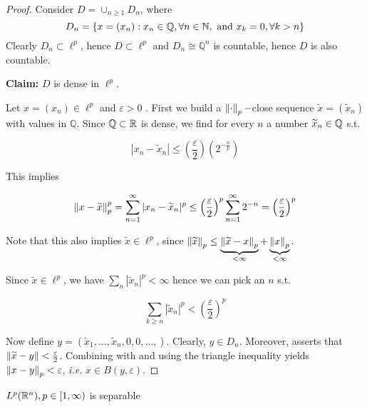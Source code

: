 \documentclass{article}
\begin{document}
\begin{proof}
	Consider \(D = \cup_{n\geq 1} D_n\), where
	\[ D_n = \{x=(x_n): x_n \in \mathbb{Q}, \forall n \in \mathbb{N}, \ \text{and} \ x_k=0, \forall k >n\}\]
	Clearly $D_n \subset \ell^p$, hence $D\subset \ell^p$ and $D_n \cong \mathbb{Q}^n$ is countable, hence $D$ is also countable.

	\textbf{Claim:} $D$ is dense in $\ell^p$.

	Let $x = (x_n) \in \ell^p$ and $\varepsilon >0$ . First we build a $\left\|{\cdot}\right\|_p-$close sequence $\widetilde{x}=(\widetilde{x}_n)$ with values in $\mathbb{Q}$. Since $\mathbb{Q} \subset \mathbb{R}$ is dense, we find for every $n$ a number $\widetilde{x}_n \in \mathbb{Q}$ s.t.

	$$
		|x_n-\widetilde{x}_n| \leq \left(\frac{\varepsilon}{2}\right) (2^{-\frac{n}{p}})
	$$

	This implies

	\begin{equation}
		\label{1}
		\left\|{x-\widetilde{x}}\right\|_p^p = \sum_{n=1}^{\infty} |x_n-\widetilde{x}_n|^p \leq \left(\frac{\varepsilon}{2}\right)^p \sum_{n=1}^{\infty} 2^{-n}=\left(\frac{\varepsilon}{2}\right)^p
	\end{equation}

	Note that this also implies $\widetilde{x} \in \ell^p$, since $\left\|{\widetilde{x}}\right\|_p \leq \underbrace{\left\|{\widetilde{x}-x}\right\|_p}_{<\infty}+\underbrace{\left\|{x}\right\|_p}_{<\infty}$.

	Since $\widetilde{x} \in \ell^p$, we have $\sum_n |\widetilde{x}_n|^p < \infty$ hence we can pick an $n$ s.t.

	\begin{equation}
		\label{2}
		\sum_{k\geq n} |\widetilde{x}_n|^p < \left(\frac{\varepsilon}{2}\right)^p
	\end{equation}

	Now define $y = (\widetilde{x}_1, \ldots, \widetilde{x}_n, 0, 0, \ldots,)$. Clearly, $y \in D_n$. Moreover,  asserts that $\left\|{\widetilde{x}-y}\right\| < \frac{\varepsilon}{2}$. Combining with  and using the triangle inequality yields $\left\|{x-y}\right\|_p < \varepsilon$, \textit{i.e.} $x\in B(y, \varepsilon)$.
\end{proof}

\begin{proposition}
	$L^p(\mathbb{R}^n), p \in [1, \infty)$ is separable
\end{proposition}
\end{document}
